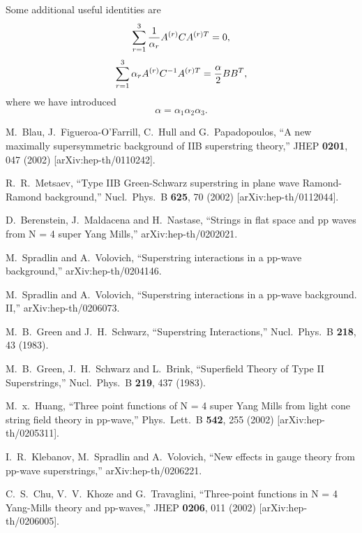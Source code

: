 \documentclass[a4paper,12pt]{article}
\begin{document}
Some additional useful identities are
\begin{equation}
\sum_{r=1}^3 {1 \over \alpha_r} A^{(r)} C A^{(r)T} =0,
\end{equation}
\begin{equation}\label{AAT2}
\sum_{r=1}^3 \alpha_r A^{(r)} C^{-1} A^{(r)T} = {\alpha \over 2} B
B^T,
\end{equation}
where we have introduced
\begin{equation}
\alpha = \alpha_1 \alpha_2 \alpha_3.
\end{equation}

\begin{thebibliography}{99}

M.~Blau, J.~Figueroa-O'Farrill, C.~Hull and G.~Papadopoulos, ``A
new maximally supersymmetric background of IIB superstring
theory,'' JHEP {\bf 0201}, 047 (2002) [arXiv:hep-th/0110242].

R.~R.~Metsaev, ``Type IIB Green-Schwarz superstring in plane wave
Ramond-Ramond  background,'' Nucl.\ Phys.\ B {\bf 625}, 70 (2002)
[arXiv:hep-th/0112044].

D.~Berenstein, J.~Maldacena and H.~Nastase, ``Strings in flat
space and pp waves from N = 4 super Yang Mills,''
arXiv:hep-th/0202021.

M.~Spradlin and A.~Volovich, ``Superstring interactions in a
pp-wave background,'' arXiv:hep-th/0204146.

M.~Spradlin and A.~Volovich, ``Superstring interactions in a
pp-wave background. II,'' arXiv:hep-th/0206073.

M.~B.~Green and J.~H.~Schwarz, ``Superstring Interactions,''
Nucl.\ Phys.\ B {\bf 218}, 43 (1983).

M.~B.~Green, J.~H.~Schwarz and L.~Brink, ``Superfield Theory of
Type II Superstrings,'' Nucl.\ Phys.\ B {\bf 219}, 437 (1983).

M.~x.~Huang, ``Three point functions of N = 4 super Yang Mills
from light cone string  field theory in pp-wave,'' Phys.\ Lett.\ B
{\bf 542}, 255 (2002) [arXiv:hep-th/0205311].

I.~R.~Klebanov, M.~Spradlin and A.~Volovich, ``New effects in
gauge theory from pp-wave superstrings,'' arXiv:hep-th/0206221.

C.~S.~Chu, V.~V.~Khoze and G.~Travaglini, ``Three-point functions
in N = 4 Yang-Mills theory and pp-waves,'' JHEP {\bf 0206}, 011
(2002) [arXiv:hep-th/0206005].

\end{thebibliography}
\end{document}
